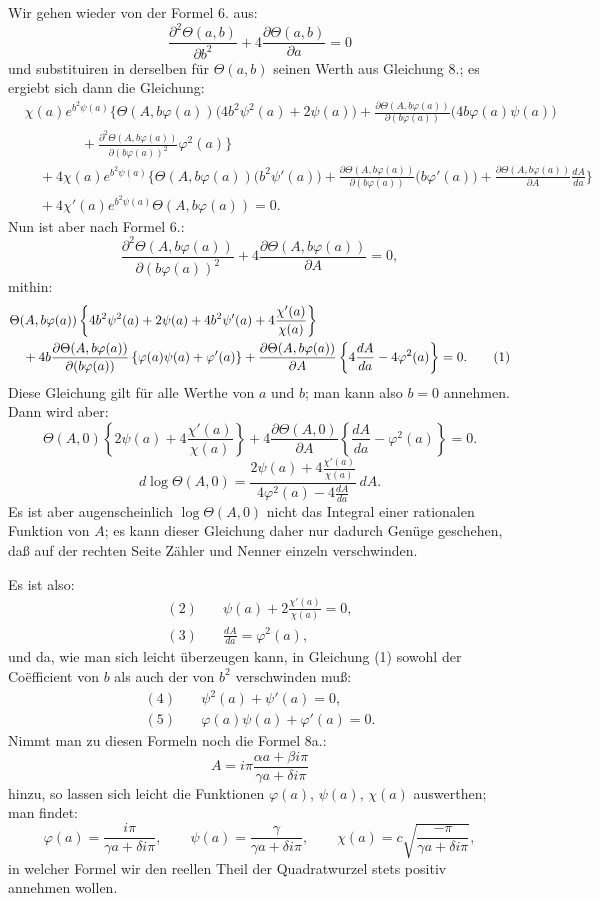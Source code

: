 \documentclass[10pt]{article}
\newcommand{\dd}{\partial}
\newcommand{\sourceanchor}[1]{\hypertarget{source-#1}{}}
\begin{document}
Wir gehen wieder von der Formel 6. aus:
\[
\frac{\dd^{2}\Theta(a,b)}{\dd b^{2}}+4\frac{\dd\Theta(a,b)}{\dd a}=0
\]
und substituiren in derselben für \(\Theta(a,b)\) seinen Werth aus Gleichung 8.; es ergiebt sich dann die Gleichung:
\begin{align*}
&\chi(a)e^{b^{2}\psi(a)}\Biggl\{\Theta(A,b\varphi(a))\bigl(4b^{2}\psi^{2}(a)+2\psi(a)\bigr)
+\frac{\dd\Theta(A,b\varphi(a))}{\dd(b\varphi(a))}\bigl(4b\varphi(a)\psi(a)\bigr)\\
&\qquad\qquad
+\frac{\dd^{2}\Theta(A,b\varphi(a))}{\dd(b\varphi(a))^{2}}\varphi^{2}(a)\Biggr\}\\
&\quad+4\chi(a)e^{b^{2}\psi(a)}\Biggl\{\Theta(A,b\varphi(a))\bigl(b^{2}\psi'(a)\bigr)
+\frac{\dd\Theta(A,b\varphi(a))}{\dd(b\varphi(a))}\bigl(b\varphi'(a)\bigr)
+\frac{\dd\Theta(A,b\varphi(a))}{\dd A}\frac{dA}{da}\Biggr\}\\
&\quad+4\chi'(a)e^{b^{2}\psi(a)}\Theta(A,b\varphi(a))=0.
\end{align*}
Nun ist aber nach Formel 6.:
\[
\frac{\dd^{2}\Theta(A,b\varphi(a))}{\dd(b\varphi(a))^{2}}+4\frac{\dd\Theta(A,b\varphi(a))}{\dd A}=0,
\]
mithin:
\sourceanchor{PA10}
\begin{align}
&\Theta(A,b\varphi(a))\left\{4b^{2}\psi^{2}(a)+2\psi(a)+4b^{2}\psi'(a)+4\frac{\chi'(a)}{\chi(a)}\right\} \notag\\
&\quad+4b\frac{\dd\Theta(A,b\varphi(a))}{\dd(b\varphi(a))}\left\{\varphi(a)\psi(a)+\varphi'(a)\right\}
+\frac{\dd\Theta(A,b\varphi(a))}{\dd A}\left\{4\frac{dA}{da}-4\varphi^{2}(a)\right\}=0. \tag{1}
\end{align}
Diese Gleichung gilt für alle Werthe von \(a\) und \(b\); man kann also \(b=0\) annehmen. Dann wird aber:
\[
\Theta(A,0)\left\{2\psi(a)+4\frac{\chi'(a)}{\chi(a)}\right\}+4\frac{\dd\Theta(A,0)}{\dd A}\left\{\frac{dA}{da}-\varphi^{2}(a)\right\}=0.
\]
\[
d\log\Theta(A,0)=\frac{2\psi(a)+4\frac{\chi'(a)}{\chi(a)}}{4\varphi^{2}(a)-4\frac{dA}{da}}\,dA.
\]
Es ist aber augenscheinlich \(\log\Theta(A,0)\) nicht das Integral einer rationalen Funktion von \(A\); es kann dieser Gleichung daher nur dadurch Genüge geschehen, daß auf der rechten Seite Zähler und Nenner einzeln verschwinden.

Es ist also:
\begin{align*}
(2)\quad&\psi(a)+2\frac{\chi'(a)}{\chi(a)}=0,\\
(3)\quad&\frac{dA}{da}=\varphi^{2}(a),
\end{align*}
und da, wie man sich leicht überzeugen kann, in Gleichung (1) sowohl der Coëfficient von \(b\) als auch der von \(b^{2}\) verschwinden muß:
\begin{align*}
(4)\quad&\psi^{2}(a)+\psi'(a)=0,\\
(5)\quad&\varphi(a)\psi(a)+\varphi'(a)=0.
\end{align*}
Nimmt man zu diesen Formeln noch die Formel 8a.:
\[
A=i\pi\frac{\alpha a+\beta i\pi}{\gamma a+\delta i\pi}
\]
hinzu, so lassen sich leicht die Funktionen \(\varphi(a)\), \(\psi(a)\), \(\chi(a)\) auswerthen; man findet:
\[
\varphi(a)=\frac{i\pi}{\gamma a+\delta i\pi},
\qquad
\psi(a)=\frac{\gamma}{\gamma a+\delta i\pi},
\qquad
\chi(a)=c\sqrt{\frac{-\pi}{\gamma a+\delta i\pi}},
\]
in welcher Formel wir den reellen Theil der Quadratwurzel stets positiv annehmen wollen.
\end{document}
